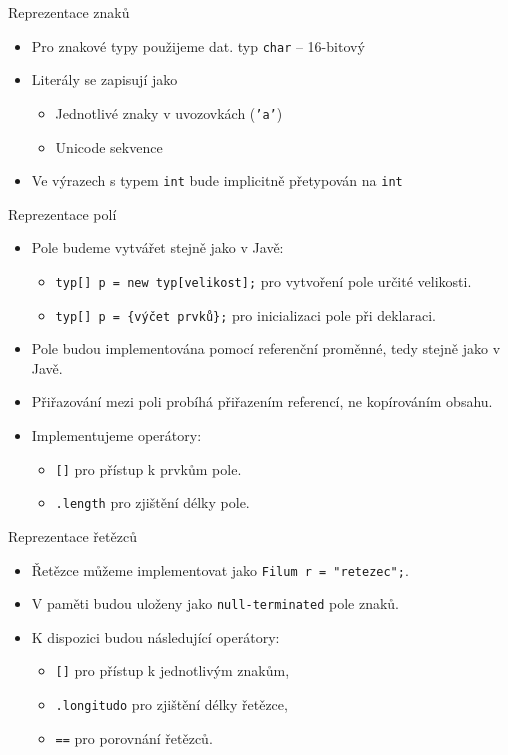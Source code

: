\documentclass[11pt]{beamer}
\begin{document}
\begin{frame}{Reprezentace znaků}
\begin{itemize}
	\item Pro znakové typy použijeme dat. typ \texttt{char} -- 16-bitový
	\item Literály se zapisují jako
	\begin{itemize}
		\item Jednotlivé znaky v uvozovkách (\texttt{'a'})
		\item Unicode sekvence 
	\end{itemize}
	\item Ve výrazech s typem \texttt{int} bude implicitně přetypován na \texttt{int}
\end{itemize}
\end{frame}
\begin{frame}{Reprezentace polí}
\begin{itemize}
        \item Pole budeme vytvářet stejně jako v Javě:
        \begin{itemize}
            \item \texttt{typ[] p = new typ[velikost];} pro vytvoření pole určité velikosti.
            \item \texttt{typ[] p = \{výčet prvků\};} pro inicializaci pole při deklaraci.
        \end{itemize}
        \item Pole budou implementována pomocí referenční proměnné, tedy stejně jako v Javě.
        \item Přiřazování mezi poli probíhá přiřazením referencí, ne kopírováním obsahu.
        \item Implementujeme operátory:
        \begin{itemize}
            \item \texttt{[]} pro přístup k prvkům pole.
            \item \texttt{.length} pro zjištění délky pole.
        \end{itemize}
    \end{itemize}
\end{frame}
\begin{frame}{Reprezentace řetězců}
\begin{itemize}
        \item Řetězce můžeme implementovat jako \texttt{Filum r = "retezec";}.
        \item V paměti budou uloženy jako \texttt{null-terminated} pole znaků.
        \item K dispozici budou následující operátory:
        \begin{itemize}
            \item \texttt{[]} pro přístup k jednotlivým znakům,
            \item \texttt{.longitudo} pro zjištění délky řetězce,
            \item \texttt{==} pro porovnání řetězců.
        \end{itemize}
    \end{itemize}
\end{frame}
\end{document}
